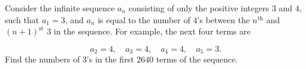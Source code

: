 Consider the infinite sequence $a_n$ consisting of only the positive integers $3$ and $4$, such that $a_1=3$, and $a_n$ is equal to the number of $4$'s between the $n^{\textrm{th}}$ and $(n+1)^{\textrm{st}}$ $3$ in the sequence. For example, the next four terms are

$$a_2=4,\quad a_3=4,\quad a_4=4,\quad a_5=3.$$Find the numbers of $3$'s in the first $2640$ terms of the sequence.

